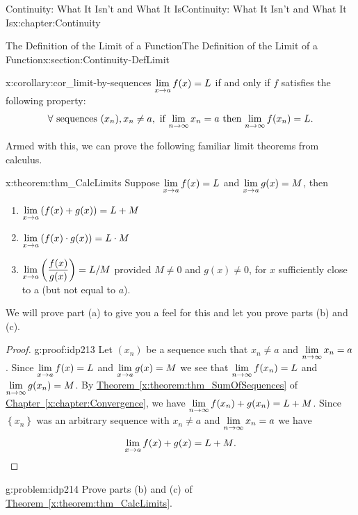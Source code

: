 \begin{chapterptx}{Continuity: What It Isn't and What It Is}{}{Continuity: What It Isn't and What It Is}{}{}{x:chapter:Continuity}
\begin{sectionptx}{The Definition of the Limit of a Function}{}{The Definition of the Limit of a Function}{}{}{x:section:Continuity-DefLimit}
\begin{corollary}{}{}{x:corollary:cor_limit-by-sequences}
			\({\displaystyle\lim_{x\rightarrow a}f(x)}=L\) if and only if \(f\) satisfies the following property:%
			\begin{equation*}
				\forall \text{ sequences }  (x_n), x_n\ne a, \text{ if } {\displaystyle\lim_{n\rightarrow \infty}x_n}=a \text{ then }   {\displaystyle\lim_{n\rightarrow \infty}f(x_n)}=L. {}
			\end{equation*}
		\end{corollary}
		Armed with this, we can prove the following familiar limit theorems from calculus.%
		\begin{theorem}{}{}{x:theorem:thm_CalcLimits}%
			 Suppose \({\displaystyle\lim_{x\rightarrow a}f(x)}=L\) and \({\displaystyle\lim_{x\rightarrow a}g(x)}=M\), then%
			\begin{enumerate}[label=(\alph*)]
				\item{}\(\displaystyle {\displaystyle\lim_{x\rightarrow a}\left(f(x)+g(x)\right)}=L+M\)%
				\item{}\(\displaystyle {\displaystyle\lim_{x\rightarrow a}\left(f(x)\cdot g(x)\right)}=L\cdot M\)%
				\item{}\({\displaystyle\lim_{x\rightarrow a}\left(\frac{f(x)}{g(x)}\right)}=L/M\) provided \(M\ne0\) and \(g(x)\ne{}0\), for \(x\) sufficiently close to a (but not equal to \(a\)).%
			\end{enumerate}
		\end{theorem}
		We will prove part (a) to give you a feel for this and let you prove parts (b) and (c).%
		\begin{proof}{}{g:proof:idp213}
			Let \(\left(x_n\right)\) be a sequence such that \(x_n\ne
			a\) and \({\displaystyle\lim_{n\rightarrow \infty}x_n}=a\).  Since \({\displaystyle\lim_{x\rightarrow a}f(x)} = L\) and \({\displaystyle\lim_{x\rightarrow a}g(x)} =
			M\) we see that \({\displaystyle\lim_{n\rightarrow \infty}f(x_n)} = L\) and \({\displaystyle\lim_{n\rightarrow \infty}g(x_n)} = M\).  By \hyperref[x:theorem:thm_SumOfSequences]{Theorem~{\xreffont\ref{x:theorem:thm_SumOfSequences}}} of \hyperref[x:chapter:Convergence]{Chapter~{\xreffont\ref{x:chapter:Convergence}}}, we have \({\displaystyle\lim_{n\rightarrow \infty}f(x_n)+g(x_n)}=L+M\).  Since \(\left\{x_n\right\}\) was an arbitrary sequence with \(x_n\ne a\) and \({\displaystyle\lim_{n\rightarrow \infty}x_n} = a\) we have%
			\begin{equation*}
				{\displaystyle\lim_{x\rightarrow a}f(x)+g(x)} = L+M\text{.}\relax
			\end{equation*}
		\end{proof}
		\begin{problem}{}{g:problem:idp214}%
			 Prove parts (b) and (c) of \hyperref[x:theorem:thm_CalcLimits]{Theorem~{\xreffont\ref{x:theorem:thm_CalcLimits}}}.%
		\end{problem}

\end{sectionptx}
\end{chapterptx}
